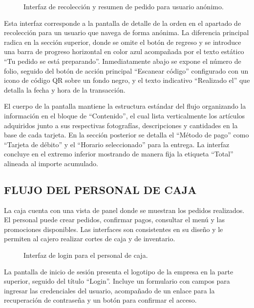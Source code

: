 \begin{figure}[H]
    \centering
    
    \caption{Interfaz de recolección y resumen de pedido para usuario anónimo.}
    \label{fig:ui-cli-16}
\end{figure}

Esta interfaz corresponde a la pantalla de detalle de la orden en el apartado de recolección para un usuario que navega de forma anónima. La diferencia principal radica en la sección superior, donde se omite el botón de regreso y se introduce una barra de progreso horizontal en color azul acompañada por el texto estático ``Tu pedido se está preparando''. Inmediatamente abajo se expone el número de folio, seguido del botón de acción principal ``Escanear código'' configurado con un icono de código QR sobre un fondo negro, y el texto indicativo ``Realizado el'' que detalla la fecha y hora de la transacción.

El cuerpo de la pantalla mantiene la estructura estándar del flujo organizando la información en el bloque de ``Contenido'', el cual lista verticalmente los artículos adquiridos junto a sus respectivas fotografías, descripciones y cantidades en la base de cada tarjeta. En la sección posterior se detalla el ``Método de pago'' como ``Tarjeta de débito'' y el ``Horario seleccionado'' para la entrega. La interfaz concluye en el extremo inferior mostrando de manera fija la etiqueta ``Total'' alineada al importe acumulado.

\subsection{FLUJO DEL PERSONAL DE CAJA}
La caja cuenta con una vista de panel donde se muestran los pedidos realizados. El personal puede crear pedidos, confirmar pagos, consultar el menú y las promociones disponibles. Las interfaces son consistentes en su diseño y le permiten al cajero realizar cortes de caja y de inventario.

\begin{figure}[H]
    \centering
    
    \caption{Interfaz de login para el personal de caja.}
    \label{fig:ui-caj-01}
\end{figure}

La pantalla de inicio de sesión presenta el logotipo de la empresa en la parte superior, seguido del título ``Login''. Incluye un formulario con campos para ingresar las credenciales del usuario, acompañado de un enlace para la recuperación de contraseña y un botón para confirmar el acceso.

